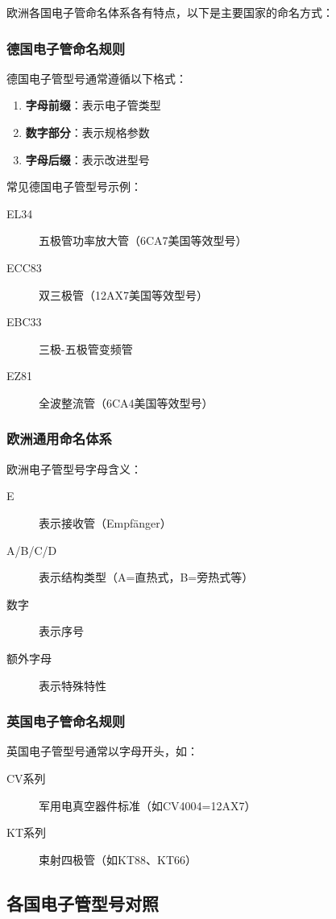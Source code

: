 \documentclass[12pt,UTF8]{ctexbook}
\begin{document}
欧洲各国电子管命名体系各有特点，以下是主要国家的命名方式：

\subsubsection{德国电子管命名规则}
德国电子管型号通常遵循以下格式：
\begin{enumerate}
    \item \textbf{字母前缀}：表示电子管类型
    \item \textbf{数字部分}：表示规格参数
    \item \textbf{字母后缀}：表示改进型号
\end{enumerate}

常见德国电子管型号示例：
\begin{description}
    \item[EL34] 五极管功率放大管（6CA7美国等效型号）
    \item[ECC83] 双三极管（12AX7美国等效型号）
    \item[EBC33] 三极-五极管变频管
    \item[EZ81] 全波整流管（6CA4美国等效型号）
\end{description}

\subsubsection{欧洲通用命名体系}
欧洲电子管型号字母含义：
\begin{description}
    \item[E] 表示接收管（Empfänger）
    \item[A/B/C/D] 表示结构类型（A=直热式，B=旁热式等）
    \item[数字] 表示序号
    \item[额外字母] 表示特殊特性
\end{description}

\subsubsection{英国电子管命名规则}
英国电子管型号通常以字母开头，如：
\begin{description}
    \item[CV系列] 军用电真空器件标准（如CV4004=12AX7）
    \item[KT系列] 束射四极管（如KT88、KT66）
\end{description}

\subsection{各国电子管型号对照}
\end{document}
